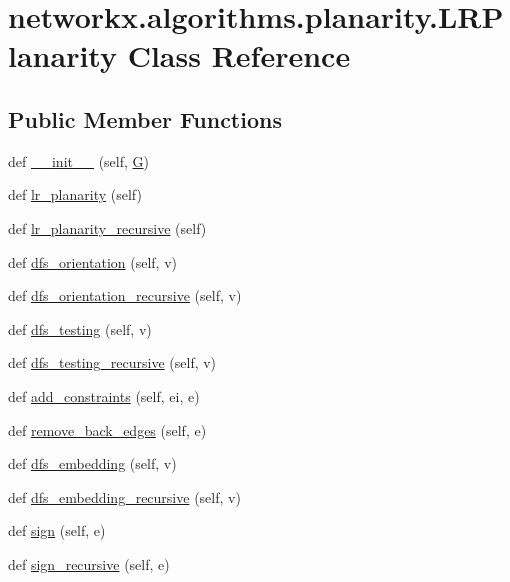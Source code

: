 \hypertarget{classnetworkx_1_1algorithms_1_1planarity_1_1LRPlanarity}{}\section{networkx.\+algorithms.\+planarity.\+L\+R\+Planarity Class Reference}
\label{classnetworkx_1_1algorithms_1_1planarity_1_1LRPlanarity}
\subsection*{Public Member Functions}
\begin{DoxyCompactItemize}
\item 
def \hyperlink{classnetworkx_1_1algorithms_1_1planarity_1_1LRPlanarity_a0e0b71159deaa522fb45853ed25d00d3}{\+\_\+\+\_\+init\+\_\+\+\_\+} (self, \hyperlink{classnetworkx_1_1algorithms_1_1planarity_1_1LRPlanarity_a90e306ef60fabd8ed8e635ccdf016812}{G})
\item 
def \hyperlink{classnetworkx_1_1algorithms_1_1planarity_1_1LRPlanarity_ab5974344f461ba8b8794045c17cdd4b9}{lr\+\_\+planarity} (self)
\item 
def \hyperlink{classnetworkx_1_1algorithms_1_1planarity_1_1LRPlanarity_acd7d6201c4958bc9d03fb3b08bf01c68}{lr\+\_\+planarity\+\_\+recursive} (self)
\item 
def \hyperlink{classnetworkx_1_1algorithms_1_1planarity_1_1LRPlanarity_aab810a66d850d38bf535e513195ed136}{dfs\+\_\+orientation} (self, v)
\item 
def \hyperlink{classnetworkx_1_1algorithms_1_1planarity_1_1LRPlanarity_aec6817aef96668c9a17d639c791f79df}{dfs\+\_\+orientation\+\_\+recursive} (self, v)
\item 
def \hyperlink{classnetworkx_1_1algorithms_1_1planarity_1_1LRPlanarity_a497a48cd330ceb964ffaac68bf4cf222}{dfs\+\_\+testing} (self, v)
\item 
def \hyperlink{classnetworkx_1_1algorithms_1_1planarity_1_1LRPlanarity_add6121e24822d4ce81b6b0b4683108e6}{dfs\+\_\+testing\+\_\+recursive} (self, v)
\item 
def \hyperlink{classnetworkx_1_1algorithms_1_1planarity_1_1LRPlanarity_a6b6d59ec58b54868e2b563c29da6dcf8}{add\+\_\+constraints} (self, ei, e)
\item 
def \hyperlink{classnetworkx_1_1algorithms_1_1planarity_1_1LRPlanarity_a2c2e661c44abbfcac0560020c22ae1d6}{remove\+\_\+back\+\_\+edges} (self, e)
\item 
def \hyperlink{classnetworkx_1_1algorithms_1_1planarity_1_1LRPlanarity_ae54bb955911b4b57d4621763147171ba}{dfs\+\_\+embedding} (self, v)
\item 
def \hyperlink{classnetworkx_1_1algorithms_1_1planarity_1_1LRPlanarity_a1296083a614bace3a230ab0adae444c5}{dfs\+\_\+embedding\+\_\+recursive} (self, v)
\item 
def \hyperlink{classnetworkx_1_1algorithms_1_1planarity_1_1LRPlanarity_a84a6ae5692557a610a0c8c9326df98f7}{sign} (self, e)
\item 
def \hyperlink{classnetworkx_1_1algorithms_1_1planarity_1_1LRPlanarity_a4e9c0d7f550b0bdf87b38531bd176a6c}{sign\+\_\+recursive} (self, e)
\end{DoxyCompactItemize}
